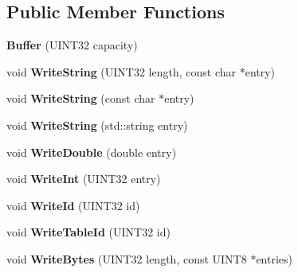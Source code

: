 \subsection*{Public Member Functions}
\begin{DoxyCompactItemize}
\item 
\hypertarget{classNetworkTables_1_1Buffer_ae89b275339e7d09b1bdb881105fac9fd}{
{\bfseries Buffer} (UINT32 capacity)}
\label{classNetworkTables_1_1Buffer_ae89b275339e7d09b1bdb881105fac9fd}

\item 
\hypertarget{classNetworkTables_1_1Buffer_aa6df0f9f9e56772ccf6156e2e9e8753e}{
void {\bfseries WriteString} (UINT32 length, const char $\ast$entry)}
\label{classNetworkTables_1_1Buffer_aa6df0f9f9e56772ccf6156e2e9e8753e}

\item 
\hypertarget{classNetworkTables_1_1Buffer_aa05721ed519952155627dfd0e7f936e3}{
void {\bfseries WriteString} (const char $\ast$entry)}
\label{classNetworkTables_1_1Buffer_aa05721ed519952155627dfd0e7f936e3}

\item 
\hypertarget{classNetworkTables_1_1Buffer_a6be73a0da7f91da376e9485c7f50e921}{
void {\bfseries WriteString} (std::string entry)}
\label{classNetworkTables_1_1Buffer_a6be73a0da7f91da376e9485c7f50e921}

\item 
\hypertarget{classNetworkTables_1_1Buffer_a1c892f59a08c638304d937d50a81bd80}{
void {\bfseries WriteDouble} (double entry)}
\label{classNetworkTables_1_1Buffer_a1c892f59a08c638304d937d50a81bd80}

\item 
\hypertarget{classNetworkTables_1_1Buffer_ab0fbfb9cfd9b51571294699cd3fea9f2}{
void {\bfseries WriteInt} (UINT32 entry)}
\label{classNetworkTables_1_1Buffer_ab0fbfb9cfd9b51571294699cd3fea9f2}

\item 
\hypertarget{classNetworkTables_1_1Buffer_abd43077d06c0b5ff1dd91a9e3dc637eb}{
void {\bfseries WriteId} (UINT32 id)}
\label{classNetworkTables_1_1Buffer_abd43077d06c0b5ff1dd91a9e3dc637eb}

\item 
\hypertarget{classNetworkTables_1_1Buffer_ac2dbf578128594ba242291d84f598d76}{
void {\bfseries WriteTableId} (UINT32 id)}
\label{classNetworkTables_1_1Buffer_ac2dbf578128594ba242291d84f598d76}

\item 
\hypertarget{classNetworkTables_1_1Buffer_a1b66c31330932e60607e37a65144f127}{
void {\bfseries WriteBytes} (UINT32 length, const UINT8 $\ast$entries)}
\label{classNetworkTables_1_1Buffer_a1b66c31330932e60607e37a65144f127}


\end{DoxyCompactItemize}
